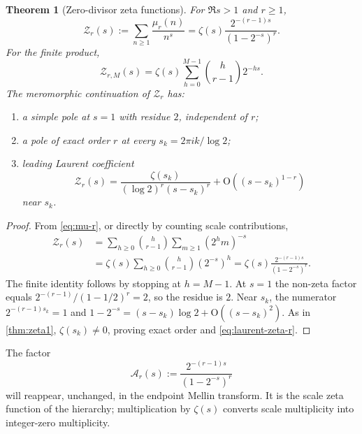 \documentclass[11pt,a4paper]{article}
\theoremstyle{frontier}
\newtheorem{theorem}{Theorem}[section]
\theoremstyle{definition}
\newcommand{\bigO}{\mathrm O}
\begin{document}
\begin{theorem}[Zero-divisor zeta functions]\label{thm:zeta-r}
For $\Re s>1$ and $r\ge1$,
\begin{equation}\label{eq:zeta-r}
  \mathcal Z_r(s):=\sum_{n\ge1}\frac{\mu_r(n)}{n^s}
  =\zeta(s)\frac{2^{-(r-1)s}}{(1-2^{-s})^r}.
\end{equation}
For the finite product,
\begin{equation}\label{eq:zeta-rM}
  \mathcal Z_{r,M}(s)
  =\zeta(s)\sum_{h=0}^{M-1}\binom h{r-1}2^{-hs}.
\end{equation}
The meromorphic continuation of $\mathcal Z_r$ has:
\begin{enumerate}[label=(\roman*)]
\item a simple pole at $s=1$ with residue $2$, independent of $r$;
\item a pole of exact order $r$ at every $s_k=2\pi ik/\log2$;
\item leading Laurent coefficient
\begin{equation}\label{eq:laurent-zeta-r}
  \mathcal Z_r(s)=
  \frac{\zeta(s_k)}{(\log2)^r(s-s_k)^r}
  +\bigO\!\left((s-s_k)^{1-r}\right)
\end{equation}
near $s_k$.
\end{enumerate}
\end{theorem}

\begin{proof}
From \eqref{eq:mu-r}, or directly by counting scale contributions,
\begin{align*}
 \mathcal Z_r(s)
 &=\sum_{h\ge0}\binom h{r-1}\sum_{m\ge1}(2^hm)^{-s}\\
 &=\zeta(s)\sum_{h\ge0}\binom h{r-1}(2^{-s})^h
 =\zeta(s)\frac{2^{-(r-1)s}}{(1-2^{-s})^r}.
\end{align*}
The finite identity follows by stopping at $h=M-1$.  At $s=1$ the non-zeta factor equals
$2^{-(r-1)}/(1-1/2)^r=2$, so the residue is $2$.  Near $s_k$, the numerator $2^{-(r-1)s_k}=1$ and
$1-2^{-s}=(s-s_k)\log2+\bigO((s-s_k)^2)$.  As in \cref{thm:zeta1}, $\zeta(s_k)\ne0$, proving exact order and \eqref{eq:laurent-zeta-r}.
\end{proof}

The factor
\begin{equation}\label{eq:scale-zeta}
  \mathcal A_r(s):=\frac{2^{-(r-1)s}}{(1-2^{-s})^r}
\end{equation}
will reappear, unchanged, in the endpoint Mellin transform.  It is the scale zeta function of the hierarchy; multiplication by $\zeta(s)$ converts scale multiplicity into integer-zero multiplicity.
\end{document}
